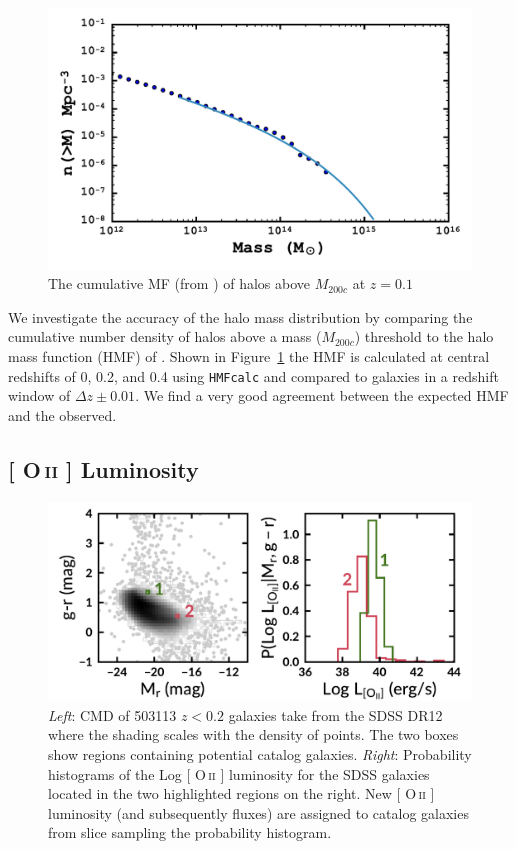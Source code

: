 \documentclass[fleqn,usenatbib]{mnras}
\makeatletter
\DeclareRobustCommand{\ion}[2]{%
\relax\ifmmode
\ifx\testbx\f@series
{\mathbf{#1\,\mathsc{#2}}}\else
{\mathrm{#1\,\mathsc{#2}}}\fi
\else\textup{#1\,{\mdseries\textsc{#2}}}%
\fi}
\makeatother
\begin{document}
\begin{figure} 
	\includegraphics[width=\columnwidth]{figures/hmf.pdf} 
	\caption{The cumulative MF (from \citealt{Tinker2008}) of halos above $M_{200c}$ at $z=0.1$} 
	\label{fig: hmf} 
\end{figure}

We investigate the accuracy of the halo mass distribution by comparing the cumulative number density of halos above a mass ($M_{200c}$) threshold to the halo mass function (HMF) of \cite{Tinker2008}. Shown in Figure~\ref{fig: hmf} the HMF is calculated at central redshifts of 0, 0.2, and 0.4 using {\tt HMFcalc} \citep{Murray2013} and compared to galaxies in a redshift window of $\Delta z\pm0.01$. We find a very good agreement between the expected HMF and the observed. 

\subsection{ {\rm[\ion{O}{ii}]} Luminosity}\label{sec: oii luminosity}
\begin{figure} 
	\includegraphics[width=\textwidth]{figures/oii_sdss.pdf} 
	\caption{\textit{Left}: CMD of 503113 $z<0.2$ galaxies take from the SDSS DR12 where the shading scales with the density of points. The two boxes show regions containing potential catalog galaxies. \textit{Right}: Probability histograms of the Log [\ion{O}{ii}] luminosity for the SDSS galaxies located in the two highlighted regions on the right. New [\ion{O}{ii}] luminosity (and subsequently fluxes) are assigned to catalog galaxies from slice sampling the probability histogram.} \label{fig: oii sdss} 
\end{figure}
\end{document}
